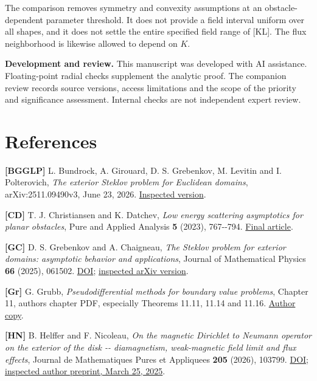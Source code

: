 \documentclass[11pt]{article}
\begin{document}
The comparison removes symmetry and convexity assumptions at an
obstacle-dependent parameter threshold. It does not provide a field
interval uniform over all shapes, and it does not settle the entire
specified field range of {[}KL{]}. The flux neighborhood is likewise
allowed to depend on \(K\).

\textbf{Development and review.} This manuscript was developed with AI
assistance. Floating-point radial checks supplement the analytic proof.
The companion review records source versions, access limitations and the
scope of the priority and significance assessment. Internal checks are
not independent expert review.

\raggedright{}\section{References}\label{references}

\textbf{{[}BGGLP{]}} L. Bundrock, A. Girouard, D. S. Grebenkov, M.
Levitin and I. Polterovich, \emph{The exterior Steklov problem for
Euclidean domains}, arXiv:2511.09490v3, June 23, 2026.
\href{https://arxiv.org/html/2511.09490v3}{Inspected version}.

\textbf{{[}CD{]}} T. J. Christiansen and K. Datchev, \emph{Low energy
scattering asymptotics for planar obstacles}, Pure and Applied Analysis
\textbf{5} (2023), 767-\/-794.
\href{https://doi.org/10.2140/paa.2023.5.767}{Final article}.

\textbf{{[}GC{]}} D. S. Grebenkov and A. Chaigneau, \emph{The Steklov
problem for exterior domains: asymptotic behavior and applications},
Journal of Mathematical Physics \textbf{66} (2025), 061502.
\href{https://doi.org/10.1063/5.0228529}{DOI};
\href{https://arxiv.org/abs/2407.09864v3}{inspected arXiv version}.

\textbf{{[}Gr{]}} G. Grubb, \emph{Pseudodifferential methods for
boundary value problems}, Chapter 11, author\textquotesingle s chapter
PDF, especially Theorems 11.11, 11.14 and 11.16.
\href{https://web.math.ku.dk/~grubb/dist11.pdf}{Author copy}.

\textbf{{[}HN{]}} B. Helffer and F. Nicoleau, \emph{On the magnetic
Dirichlet to Neumann operator on the exterior of the disk -\/-
diamagnetism, weak-magnetic field limit and flux effects}, Journal de
Mathematiques Pures et Appliquees \textbf{205} (2026), 103799.
\href{https://doi.org/10.1016/j.matpur.2025.103799}{DOI};
\href{https://arxiv.org/abs/2503.14008v2}{inspected author preprint,
March 25, 2025}.
\end{document}
